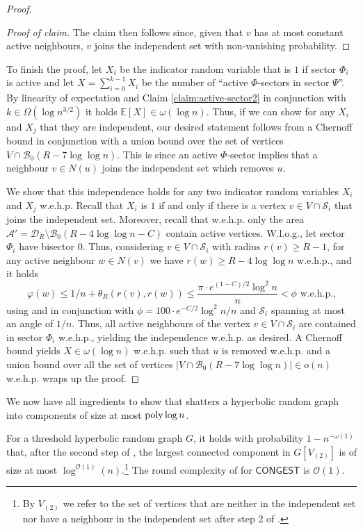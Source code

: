 \documentclass[letterpaper,11pt]{article}
\newcommand{\Exp}[1]{\mathbb{E}\left[#1\right]}
\newcommand{\poly}{\operatorname{\text{{\rm poly}}}}
\newcommand{\wehp}{w.e.h.p.\xspace}
\newcommand{\B}{\mathcal B}
\newcommand{\disk}{\ensuremath{\mathcal D_R}\xspace}
\newcommand{\1}{\mathbb I}
\newcommand{\bigO}{\mathcal{O}}
\newcommand{\CONGEST}{\ensuremath{\mathsf{CONGEST}}\xspace}
\begin{document}
\begin{proof}
{\begin{proof}[Proof of claim]
The claim then follows since, given that $v$ has at most constant active neighbours, $v$ joins the independent set with non-vanishing probability.
\end{proof}}
%
To finish the proof, let $X_i$ be the indicator random variable that is $1$ if sector $\Phi_i$ is active and let $X = \sum_{i=0}^{k-1}X_i$ be the number of ``active $\Phi$-sectors in sector $\Psi$''. By linearity of expectation and Claim \ref{claim:active-sector2} in conjunction with $k \in \Omega(\log n^{3/2})$ it holds $\Exp{X} \in \omega(\log n)$. Thus, if we can show for any $X_i$ and $X_j$ that they are independent, our desired statement follows from a Chernoff bound in conjunction with a union bound over the set of vertices $V \cap \B_0(R - 7\log\log n)$. This is since an active $\Phi$-sector implies that a neighbour $v \in N(u)$ joins the independent set which removes $u$.

We show that this independence holds for any two indicator random variables $X_i$ and $X_j$ \wehp Recall that $X_i$ is $1$ if and only if there is a vertex $v \in V \cap \mathcal{S}_i$ that joins the independent set. Moreover, recall that \wehp only the area $\mathcal{A}' = \disk \setminus \B_0(R-4\log\log n -C)$ contain active vertices. W.l.o.g., let sector $\Phi_i$ have bisector $0$. Thus, considering $v \in V \cap \mathcal{S}_i$ with radius $r(v) \geq R - 1$, for any active neighbour $w \in N(v)$ we have $r(w) \geq R - 4\log\log n$ \wehp, and it holds
%
$$
\varphi(w) \leq 1/n + \theta_R(r(v), r(w)) \leq \frac{\pi \cdot e^{(1-C)/2} \log^2 n}{n} < \phi \text{ \wehp,}
$$
%
using  and  in conjunction with $\phi = 100 \cdot e^{-C/2} \log ^2 n /n$ and $\mathcal{S}_i$ spanning at most an angle of $1/n$. Thus, all active neighbours of the vertex $v \in V \cap \mathcal{S}_i$ are contained in sector $\Phi_i$ \wehp, yielding the independence \wehp as desired. A Chernoff bound yields $X \in \omega(\log n)$ \wehp such that $u$ is removed \wehp and a union bound over all the set of vertices $|V \cap \B_0(R - 7\log\log n)| \in o(n)$ \wehp wraps up the proof.
\end{proof}
%
We now have all ingredients to show that \algo shatters a hyperbolic random graph into components of size at most $\poly\log n$.
%
\begin{proposition}\label{pro:shattering-mis}
    For a threshold hyperbolic random graph $G$, it holds with probability $1 - n^{-\omega(1)}$ that, after the second step of \algo, the largest connected component in $G[V_{(2)}]$ is of size at most $\log^{\bigO(1)}(n)$.\footnote{By $V_{(2)}$ we refer to the set of vertices that are neither in the independent set nor have a neighbour in the independent set after step 2 of \algo.} The round complexity of \algo for $\CONGEST$ is $\bigO(1)$.
\end{proposition}
\end{document}

